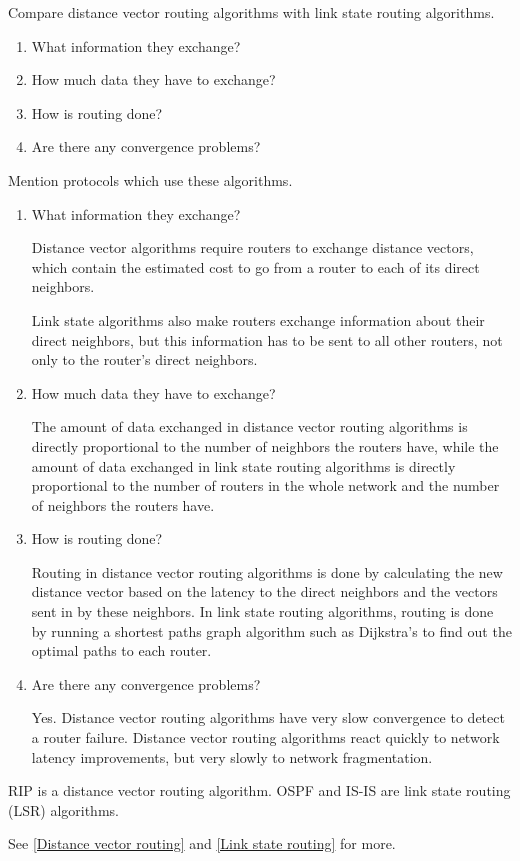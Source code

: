 \begin{Exercise}
Compare distance vector routing algorithms with link state routing algorithms.
\begin{enumerate}
\item What information they exchange?
\item How much data they have to exchange?
\item How is routing done?
\item Are there any convergence problems?
\end{enumerate}
Mention protocols which use these algorithms.
\end{Exercise}
\begin{Answer}
\begin{enumerate}
\item What information they exchange?

Distance vector algorithms require routers to exchange distance vectors, which contain the estimated cost to go from a router to each of its direct neighbors.

Link state algorithms also make routers exchange information about their direct neighbors, but this information has to be sent to all other routers, not only to the router's direct neighbors.

\item How much data they have to exchange?

The amount of data exchanged in distance vector routing algorithms is directly proportional to the number of neighbors the routers have, while the amount of data exchanged in link state routing algorithms is directly proportional to the number of routers in the whole network and the number of neighbors the routers have.

\item How is routing done?

Routing in distance vector routing algorithms is done by calculating the new distance vector based on the latency to the direct neighbors and the vectors sent in by these neighbors.
In link state routing algorithms, routing is done by running a shortest paths graph algorithm such as Dijkstra's to find out the optimal paths to each router.

\item Are there any convergence problems?

Yes. Distance vector routing algorithms have very slow convergence to detect a router failure. Distance vector routing algorithms react quickly to network latency improvements, but very slowly to network fragmentation.
\end{enumerate}

RIP is a distance vector routing algorithm. OSPF and IS-IS are link state routing (LSR) algorithms.

See \ref{Distance vector routing} and \ref{Link state routing} for more.
\end{Answer}

